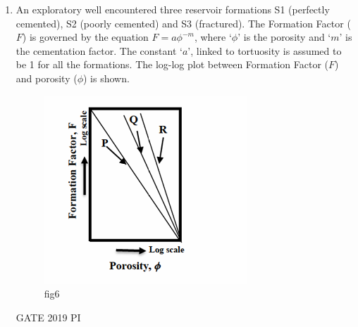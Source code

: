\documentclass[journal,12pt,onecolumn]{IEEEtran}
\theoremstyle{remark}
\begin{document}
\begin{enumerate}
\hfill{GATE 2019 PI}

\begin{multicols}{2}
\begin{enumerate}
    \item P-I, Q-IV, R-III, S-II
    \item P-I, Q-II, R-IV, S-III
    \item P-IV, Q-III, R-I, S-II
    \item P-IV, Q-I, R-II, S-III
\end{enumerate}
\end{multicols}
\item An exploratory well encountered three reservoir formations S1 (perfectly cemented), S2 (poorly cemented) and S3 (fractured). The Formation Factor ($F$) is governed by the equation $F = a\phi^{-m}$, where `$\phi$' is the porosity and `$m$' is the cementation factor. The constant `$a$', linked to tortuosity is assumed to be 1 for all the formations. The log-log plot between Formation Factor ($F$) and porosity ($\phi$) is shown.
\begin{figure}[H]
    \centering
    \includegraphics[width=0.5\linewidth]{figs/Q.32.png}
    \caption{fig6}
    \label{fig:figs/Q.32.png}
\end{figure}
\hfill{GATE 2019 PI}


\end{enumerate}
\end{document}
